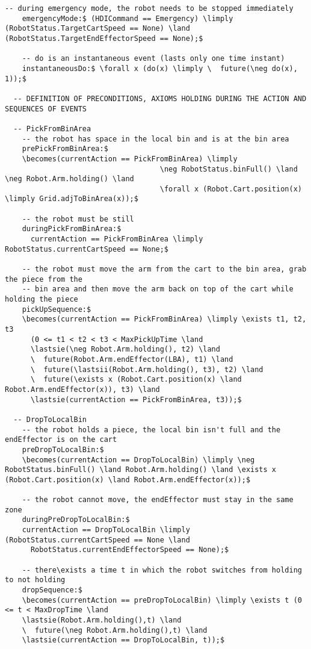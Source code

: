 \begin{lstlisting}[fontadjust, mathescape, frame=single]
    -- during emergency mode, the robot needs to be stopped immediately
    emergencyMode:$ (HDICommand == Emergency) \limply (RobotStatus.TargetCartSpeed == None) \land (RobotStatus.TargetEndEffectorSpeed == None);$

    -- do is an instantaneous event (lasts only one time instant)
    instantaneousDo:$ \forall x (do(x) \limply \  future(\neg do(x), 1));$

  -- DEFINITION OF PRECONDITIONS, AXIOMS HOLDING DURING THE ACTION AND SEQUENCES OF EVENTS

  -- PickFromBinArea
    -- the robot has space in the local bin and is at the bin area
    prePickFromBinArea:$
    \becomes(currentAction == PickFromBinArea) \limply
                                    \neg RobotStatus.binFull() \land \neg Robot.Arm.holding() \land
                                    \forall x (Robot.Cart.position(x) \limply Grid.adjToBinArea(x));$

    -- the robot must be still
    duringPickFromBinArea:$
      currentAction == PickFromBinArea \limply RobotStatus.currentCartSpeed == None;$

    -- the robot must move the arm from the cart to the bin area, grab the piece from the
    -- bin area and then move the arm back on top of the cart while holding the piece
    pickUpSequence:$
    \becomes(currentAction == PickFromBinArea) \limply \exists t1, t2, t3
      (0 <= t1 < t2 < t3 < MaxPickUpTime \land
      \lastsie(\neg Robot.Arm.holding(), t2) \land
      \  future(Robot.Arm.endEffector(LBA), t1) \land
      \  future(\lastsii(Robot.Arm.holding(), t3), t2) \land
      \  future(\exists x (Robot.Cart.position(x) \land Robot.Arm.endEffector(x)), t3) \land
      \lastsie(currentAction == PickFromBinArea, t3));$
      
  -- DropToLocalBin
    -- the robot holds a piece, the local bin isn't full and the endEffector is on the cart
    preDropToLocalBin:$
    \becomes(currentAction == DropToLocalBin) \limply \neg RobotStatus.binFull() \land Robot.Arm.holding() \land \exists x (Robot.Cart.position(x) \land Robot.Arm.endEffector(x));$
    
    -- the robot cannot move, the endEffector must stay in the same zone
    duringPreDropToLocalBin:$
    currentAction == DropToLocalBin \limply (RobotStatus.currentCartSpeed == None \land
      RobotStatus.currentEndEffectorSpeed == None);$
  
    -- there\exists a time t in which the robot switches from holding to not holding
    dropSequence:$
    \becomes(currentAction == preDropToLocalBin) \limply \exists t (0 <= t < MaxDropTime \land 
    \lastsie(Robot.Arm.holding(),t) \land 
    \  future(\neg Robot.Arm.holding(),t) \land 
    \lastsie(currentAction == DropToLocalBin, t));$
  

\end{lstlisting}
